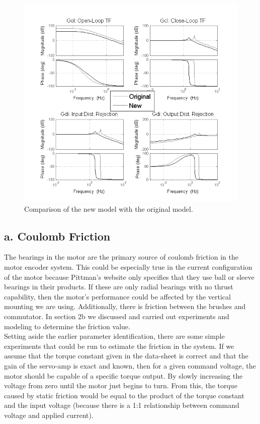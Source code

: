 \documentclass{article}
\theoremstyle{plain}
\theoremstyle{definition}
\theoremstyle{remark}
\begin{document}
\begin{figure}[htb]
\begin{center}
\includegraphics[width = 13.5cm]{Original_vsNew.png}
\caption{Comparison of the new model with the original model.}
\label{q5_orig_v_new}
\end{center}
\end{figure}

\clearpage

\subsection*{a. Coulomb Friction}
The bearings in the motor are the primary source of coulomb friction in the motor encoder system. This could be especially true in the current configuration of the motor because Pittman's website only specifies that they use ball or sleeve bearings in their products. If these are only radial bearings with no thrust capability, then the motor's performance could be affected by the vertical mounting we are using. Additionally, there is friction between the brushes and commutator. In section 2b we discussed and carried out experiments and modeling to determine the friction value.\\

Setting aside the earlier parameter identification, there are some simple experiments that could be run to estimate the friction in the system. If we assume that the torque constant given in the data-sheet is correct and that the gain of the servo-amp is exact and known, then for a given command voltage, the motor should be capable of a specific torque output. By slowly increasing the voltage from zero until the motor just begins to turn. From this, the torque caused by static friction would be equal to the product of the torque constant and the input voltage (because there is a 1:1 relationship between command voltage and applied current). \\
\end{document}
